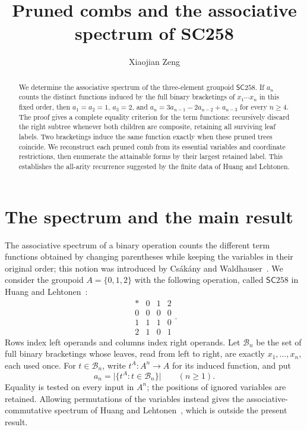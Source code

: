 \documentclass[11pt]{amsart}
\title[The associative spectrum of SC258]{Pruned combs and the associative spectrum of SC258}
\author{Xiaojian Zeng}
\date{}
\newcommand{\B}{\mathcal{B}}
\newcommand{\SC}{\mathsf{SC}258}
\begin{document}
\begin{abstract}
We determine the associative spectrum of the three-element groupoid
\(\SC\). If \(a_n\) counts the distinct functions induced by the full
binary bracketings of \(x_1\cdots x_n\) in this fixed order, then
\(a_1=a_2=1\), \(a_3=2\), and
\(a_n=3a_{n-1}-2a_{n-2}+a_{n-3}\) for every \(n\geq4\).
The proof gives a complete equality criterion for the term functions:
recursively discard the right subtree whenever both children are composite,
retaining all surviving leaf labels. Two bracketings induce the same function
exactly when these pruned trees coincide. We reconstruct each pruned comb
from its essential variables and coordinate restrictions, then enumerate the
attainable forms by their largest retained label. This establishes the
all-arity recurrence suggested by the finite data of Huang and Lehtonen.
\end{abstract}
\maketitle

\section{The spectrum and the main result}

The associative spectrum of a binary operation counts the different term
functions obtained by changing parentheses while keeping the variables in
their original order; this notion was introduced by Cs\'ak\'any and
Waldhauser~\cite{CsakanyWaldhauser2000}. We consider the groupoid
\(A=\{0,1,2\}\) with the following operation, called \(\SC\) in
Huang and Lehtonen~\cite[Section~7]{HuangLehtonen2024}:
\begin{equation}\label{eq:table}
\begin{array}{c|ccc}
 *&0&1&2\\\hline
 0&0&0&0\\
 1&1&1&0\\
 2&1&0&1
\end{array}.
\end{equation}
Rows index left operands and columns index right operands.
Let \(\B_n\) be the set of full binary bracketings whose leaves, read
from left to right, are exactly \(x_1,\ldots,x_n\), each used once.
For \(t\in\B_n\), write \(t^A\colon A^n\to A\) for its induced
function, and put
\[
 a_n=\bigl|\{t^A:t\in\B_n\}\bigr|\qquad(n\geq1).
\]
Equality is tested on every input in \(A^n\); the positions of ignored
variables are retained. Allowing permutations of the variables instead
gives the associative-commutative spectrum of Huang and
Lehtonen~\cite{HuangLehtonen2023}, which is outside the present result.
\end{document}
